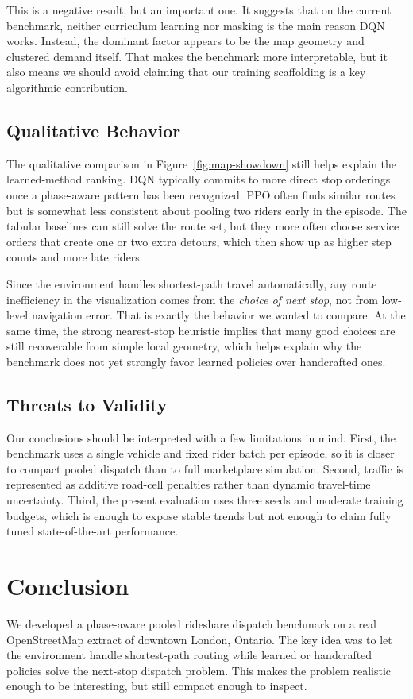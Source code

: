 \documentclass{article}
\begin{document}
This is a negative result, but an important one. It suggests that on the current benchmark, neither curriculum learning nor masking is the main reason DQN works. Instead, the dominant factor appears to be the map geometry and clustered demand itself. That makes the benchmark more interpretable, but it also means we should avoid claiming that our training scaffolding is a key algorithmic contribution.

\subsection{Qualitative Behavior}
The qualitative comparison in Figure~\ref{fig:map-showdown} still helps explain the learned-method ranking. DQN typically commits to more direct stop orderings once a phase-aware pattern has been recognized. PPO often finds similar routes but is somewhat less consistent about pooling two riders early in the episode. The tabular baselines can still solve the route set, but they more often choose service orders that create one or two extra detours, which then show up as higher step counts and more late riders.

Since the environment handles shortest-path travel automatically, any route inefficiency in the visualization comes from the \emph{choice of next stop}, not from low-level navigation error. That is exactly the behavior we wanted to compare. At the same time, the strong nearest-stop heuristic implies that many good choices are still recoverable from simple local geometry, which helps explain why the benchmark does not yet strongly favor learned policies over handcrafted ones.

\subsection{Threats to Validity}
Our conclusions should be interpreted with a few limitations in mind. First, the benchmark uses a single vehicle and fixed rider batch per episode, so it is closer to compact pooled dispatch than to full marketplace simulation. Second, traffic is represented as additive road-cell penalties rather than dynamic travel-time uncertainty. Third, the present evaluation uses three seeds and moderate training budgets, which is enough to expose stable trends but not enough to claim fully tuned state-of-the-art performance.

\section{Conclusion}
We developed a phase-aware pooled rideshare dispatch benchmark on a real OpenStreetMap extract of downtown London, Ontario. The key idea was to let the environment handle shortest-path routing while learned or handcrafted policies solve the next-stop dispatch problem. This makes the problem realistic enough to be interesting, but still compact enough to inspect.
\end{document}

